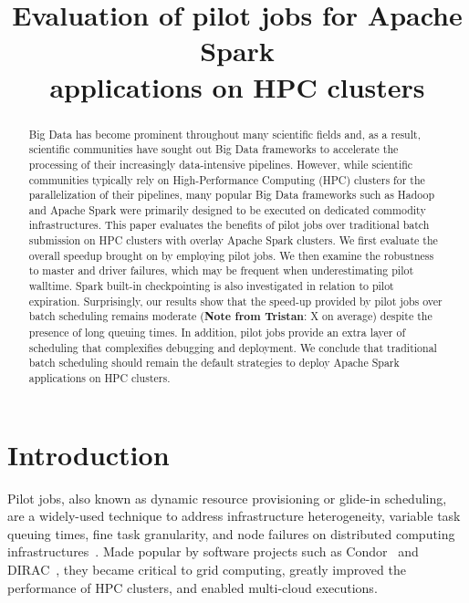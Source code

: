 \documentclass{IEEEtran}
\newcommand{\tristan}[1]{\color{red}\textbf{Note from Tristan}:
      #1 \color{black}}
\newcommand{\TG}[1]{\tristan{#1}}
\begin{document}
\title{Evaluation of pilot jobs for Apache Spark\\ applications on HPC clusters}
\author{
    \IEEEauthorblockA{}
}
\maketitle

\begin{abstract}
    Big Data has become prominent throughout many scientific fields and, as
    a result, scientific communities have sought out Big Data frameworks to
    accelerate the processing of their increasingly data-intensive
    pipelines. However, while scientific communities typically rely on
    High-Performance Computing (HPC) clusters for the parallelization of
    their pipelines, many popular Big Data frameworks such as Hadoop and
    Apache Spark were primarily designed to be executed on dedicated
    commodity infrastructures. This paper evaluates the benefits of pilot
    jobs over traditional batch submission on HPC clusters with overlay
    Apache Spark clusters. We first evaluate the overall speedup brought on
    by employing pilot jobs. We then examine the robustness to master and
    driver failures, which may be frequent when underestimating pilot
    walltime. Spark built-in checkpointing is also investigated in relation
    to pilot expiration. Surprisingly, our results show that the speed-up
    provided by pilot jobs over batch scheduling remains moderate (\TG{X} on
    average) despite the presence of long queuing times. In addition, pilot
    jobs provide an extra layer of scheduling that complexifies debugging
    and deployment. We conclude that traditional batch scheduling should
    remain the default strategies to deploy Apache Spark applications on
    HPC clusters.

\end{abstract}

\section{Introduction}

Pilot jobs, also known as dynamic resource provisioning or glide-in
scheduling, are a widely-used technique to address infrastructure
heterogeneity, variable task queuing times, fine task granularity, and node
failures on distributed computing infrastructures~\cite{jakubsmodel}. Made popular by software
projects such as Condor~\cite{thain2005distributed} and DIRAC~\cite{casajus2010dirac}, they
became critical to grid computing, greatly improved the performance of HPC
clusters, and enabled multi-cloud executions. 
\end{document}
